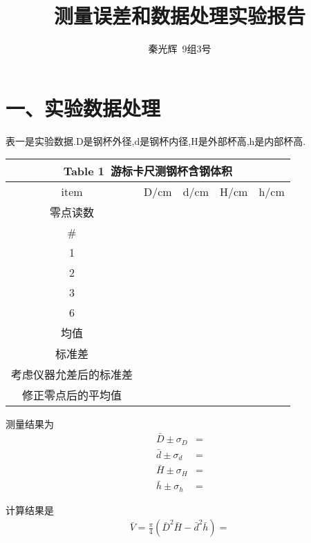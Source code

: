 \documentclass[a4paper,10pt,notitlepage]{report}
\begin{document}
\title{测量误差和数据处理实验报告}
\author{秦光辉\ 9组3号}
\maketitle

\section*{一、实验数据处理}

	表一是实验数据.D是钢杯外径,d是钢杯内径,H是外部杯高,h是内部杯高. \\
	
\begin{table}[htbp]
\centering
	\begin{tabular}{|c|c|c|c|c|}
	
		\multicolumn{5}{c}{Table 1\ 游标卡尺测钢杯含钢体积} \\
		\hline
		item & D/cm & d/cm & H/cm & h/cm \\
		\hline
		零点读数 &  \\
		\hline
		\# &  \\
		\hline
		1 & \\
		\hline
		2 & \\
		\hline
		3 & \\
		\hline
		6 &  \\
		\hline
		均值 & \\
		\hline
		标准差 & \\
		\hline
		考虑仪器允差后的标准差 & \\
		\hline
		修正零点后的平均值 & \\
		\hline

	\end{tabular}
\end{table}

	测量结果为 \\
	
\begin{align}
	\bar{D} \pm \sigma_{D} &= \\
	\bar{d} \pm \sigma_{d} &= \\
	\bar{H} \pm \sigma_{H} &= \\
	\bar{h} \pm \sigma_{h} &= 
\end{align}

	计算结果是 \\
	
\begin{align}
	\bar{V} = \frac{\pi}{4}(\bar{D}^2 \bar{H} - \bar{d}^2 \bar{h}) = 
\end{align}
\end{document}
